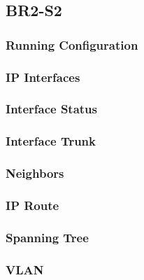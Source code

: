 \subsection{BR2-S2}
\subsubsection{Running Configuration}


\subsubsection{IP Interfaces}


\subsubsection{Interface Status}


\subsubsection{Interface Trunk}


\subsubsection{Neighbors}


\subsubsection{IP Route}


\subsubsection{Spanning Tree}


\subsubsection{VLAN}





